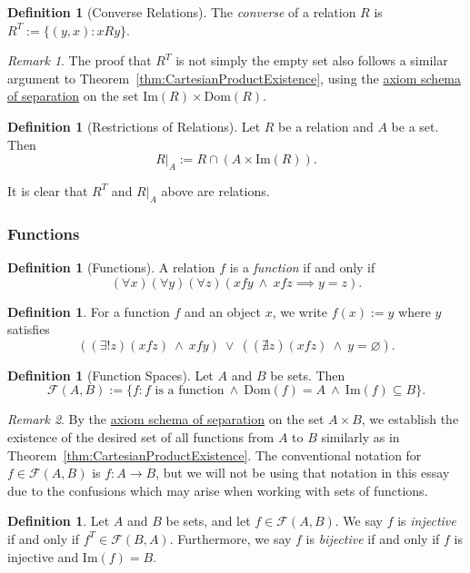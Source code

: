 \documentclass[a4paper,11pt]{article}
\theoremstyle{plain}
\theoremstyle{definition}
\newtheorem{defn}[thm]{Definition}
\theoremstyle{remark}
\newtheorem*{rem}{Remark}
\begin{document}
\begin{defn}[Converse Relations]
The \textit{converse} of a relation $R$ is $R^T := \{(y, x) : xRy\}$.
\end{defn}
\begin{rem}
The proof that $R^T$ is not simply the empty set also follows a similar argument to Theorem~\ref{thm:CartesianProductExistence}, using the \hyperref[axiom:separation]{axiom schema of separation} on the set $\textrm{Im}(R) \times \mathrm{Dom}(R)$.
\end{rem}

\begin{defn}[Restrictions of Relations]
Let $R$ be a relation and $A$ be a set. Then
\[R|_A := R \cap (A \times \textrm{Im}(R)).\]
\end{defn}
\noindent It is clear that $R^T$ and $R|_A$ above are relations.

\subsubsection{Functions}
\label{subsec:Func}
\begin{defn}[Functions]
A relation $f$ is a \textit{function} if and only if 
\[(\forall x)(\forall y)(\forall z)(xfy \ \land \ xfz \implies y = z).\]
\end{defn}

\begin{defn}
For a function $f$ and an object $x$, we write $f(x) := y$ where $y$ satisfies
\[((\exists! z)(xfz)\ \land\ xfy) \ \lor \ ((\nexists z)(xfz) \ \land \ y = \varnothing).\]
\end{defn}

\begin{defn}[Function Spaces]
\label{defn:SetOfFunctions}
Let $A$ and $B$ be sets. Then 
\[\mathscr F(A, B) := \{f : f \text{ is a function} \ \land \ \mathrm{Dom}(f) = A \ \land \ \mathrm{Im}(f) \subseteq B\}.\]
\end{defn}
\begin{rem}
By the \hyperref[axiom:separation]{axiom schema of separation} on the set $A \times B$, we establish the existence of the desired set of all functions from $A$ to $B$ similarly as in Theorem~\ref{thm:CartesianProductExistence}. The conventional notation for $f \in \mathscr F(A, B)$ is $f : A \to B$, but we will not be using that notation in this essay due to the confusions which may arise when working with sets of functions.
\end{rem}

\begin{defn}
Let $A$ and $B$ be sets, and let $f \in \mathscr F(A, B)$. We say $f$ is \textit{injective} if and only if $f^T \in \mathscr F(B, A)$. Furthermore, we say $f$ is \textit{bijective} if and only if $f$ is injective and $\mathrm{Im}(f) = B$.
\end{defn}
\end{document}
